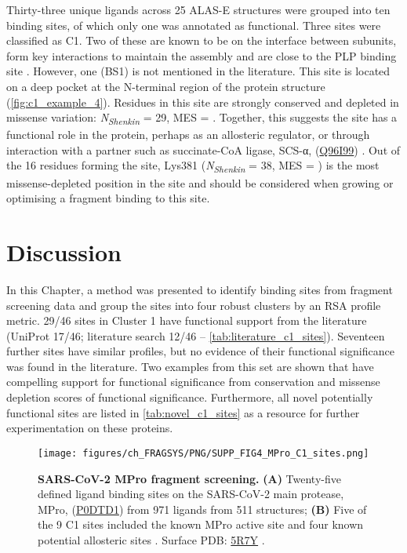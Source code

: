 {Thirty-three unique ligands across 25 ALAS-E structures were grouped into ten binding sites, of which only one was annotated as functional. Three sites were classified as C1. Two of these are known to be on the interface between subunits, form key interactions to maintain the assembly and are close to the PLP binding site \cite{BAILEY_2020_AMINOLEVULINATE}. However, one (BS1) is not mentioned in the literature. This site is located on a deep pocket at the N-terminal region of the protein structure (\autoref{fig:c1_example_4}). Residues in this site are strongly conserved and depleted in missense variation: \textit{N\textsubscript{Shenkin}} = 29, MES = . Together, this suggests the site has a functional role in the protein, perhaps as an allosteric regulator, or through interaction with a partner such as succinate-CoA ligase, SCS-α, (\href{https://www.uniprot.org/uniprotkb/Q96I99/entry}{Q96I99}) \cite{FURUYAMA_2000_SIDEROBLASTIC}. Out of the 16 residues forming the site, Lys381 (\textit{N\textsubscript{Shenkin}} = 38, MES = ) is the most missense-depleted position in the site and should be considered when growing or optimising a fragment binding to this site.

\vspace{-13pt} %

\section{Discussion}

In this Chapter, a method was presented to identify binding sites from fragment screening data and group the sites into four robust clusters by an RSA profile metric. 29/46 sites in Cluster 1 have functional support from the literature (UniProt 17/46; literature search 12/46 -- \autoref{tab:literature_c1_sites}). Seventeen further sites have similar profiles, but no evidence of their functional significance was found in the literature. Two examples from this set are shown that have compelling support for functional significance from conservation and missense depletion scores of functional significance. Furthermore, all novel potentially functional sites are listed in \autoref{tab:novel_c1_sites} as a resource for further experimentation on these proteins.

\begin{figure}[htb!]
    \centering
    \texttt{[image: figures/ch\_FRAGSYS/PNG/SUPP\_FIG4\_MPro\_C1\_sites.png]}
    \caption[SARS-CoV-2 MPro fragment screening]{\textbf{SARS-CoV-2 MPro fragment screening.} \textbf{(A)} Twenty-five defined ligand binding sites on the SARS-CoV-2 main protease, MPro, (\href{https://www.uniprot.org/uniprotkb/P0DTD1/entry}{P0DTD1}) from 971 ligands from 511 structures; \textbf{(B)} Five of the 9 C1 sites included the known MPro active site and four known potential allosteric sites \cite{DOUANGAMATH_2020_SARSCOV2, DASGUPTA_2022_ALLOSTERIC}. Surface PDB: \href{https://www.ebi.ac.uk/pdbe/entry/pdb/5R7Y}{5R7Y} \cite{DOUANGAMATH_2020_SARSCOV2}.}
    \label{fig:MPro_showcase}
\end{figure}

}
